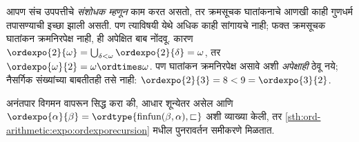 आपण संच उपपत्तीचे \emph{संशोधक म्हणून} काम करत असतो, तर क्रमसूचक घातांकनाचे आणखी काही गुणधर्म तपासण्याची इच्छा झाली असती. पण त्याविषयी येथे अधिक काही सांगायचे नाही; फक्त क्रमसूचक घातांकन क्रमनिरपेक्ष नाही, ही अपेक्षित बाब नोंदवू. कारण $\ordexpo{2}{\omega} =
\bigcup_{\delta < \omega}\ordexpo{2}{\delta} = \omega$, तर $\ordexpo{\omega}{2} = \omega \ordtimes \omega$. पण घातांकन क्रमनिरपेक्ष असावे अशी \emph{अपेक्षाही} ठेवू नये; नैसर्गिक संख्यांच्या बाबतीतही तसे नाही: $\ordexpo{2}{3} = 8 < 9 = \ordexpo{3}{2}$.

\begin{prob}
अनंतपार विगमन वापरून सिद्ध करा की, आधार शून्येतर असेल आणि $\ordexpo{\alpha}{\beta} = \ordtype{\text{finfun}(\beta, \alpha),
\sqsubset}$ अशी व्याख्या केली, तर \ref{sth:ord-arithmetic:expo:ordexporecursion} मधील पुनरावर्तन समीकरणे मिळतात.
\end{prob}



